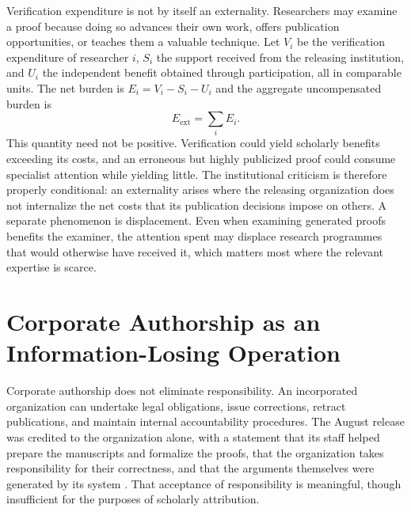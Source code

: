 \documentclass[12pt]{article}
\begin{document}
Verification expenditure is not by itself an externality. Researchers may examine a proof because doing so advances their own work, offers publication opportunities, or teaches them a valuable technique. Let $V_i$ be the verification expenditure of researcher $i$, $S_i$ the support received from the releasing institution, and $U_i$ the independent benefit obtained through participation, all in comparable units. The net burden is $E_i=V_i-S_i-U_i$ and the aggregate uncompensated burden is
\begin{equation}
E_{\mathrm{ext}}=\sum_i E_i .
\end{equation}
This quantity need not be positive. Verification could yield scholarly benefits exceeding its costs, and an erroneous but highly publicized proof could consume specialist attention while yielding little. The institutional criticism is therefore properly conditional: an externality arises where the releasing organization does not internalize the net costs that its publication decisions impose on others. A separate phenomenon is displacement. Even when examining generated proofs benefits the examiner, the attention spent may displace research programmes that would otherwise have received it, which matters most where the relevant expertise is scarce.

\section{Corporate Authorship as an Information-Losing Operation}

Corporate authorship does not eliminate responsibility. An incorporated organization can undertake legal obligations, issue corrections, retract publications, and maintain internal accountability procedures. The August release was credited to the organization alone, with a statement that its staff helped prepare the manuscripts and formalize the proofs, that the organization takes responsibility for their correctness, and that the arguments themselves were generated by its system \cite{openai-ten-advances}. That acceptance of responsibility is meaningful, though insufficient for the purposes of scholarly attribution.
\end{document}
